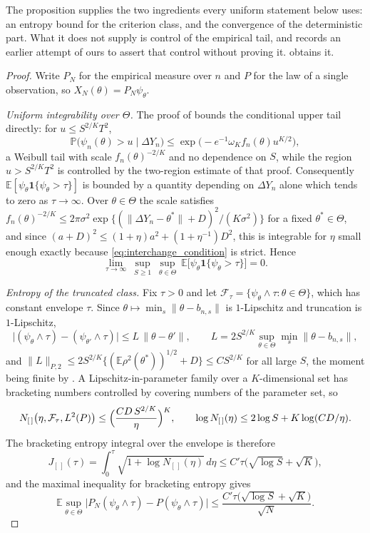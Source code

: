 \documentclass[11pt]{article}
\theoremstyle{definition}
\newcommand{\E}{\mathbb{E}}
\newcommand{\Pp}{\mathbb{P}}
\begin{document}
The proposition supplies the two ingredients every uniform statement below uses: an entropy bound for the criterion class, and the convergence of the deterministic part. What it does not supply is control of the empirical tail, and  records an earlier attempt of ours to assert that control without proving it.  obtains it.

\begin{proof}
Write $P_N$ for the empirical measure over $n$ and $P$ for the law of a single observation, so $X_N(\theta)=P_N\psi_\theta$.

\emph{Uniform integrability over $\Theta$.} The proof of  bounds the conditional upper tail directly: for $u\le S^{2/K}T^2$,
\[
\Pp\bigl(\psi_n(\theta)>u\mid\Delta Y_n\bigr)\le\exp\bigl(-e^{-1}\omega_Kf_n(\theta)u^{K/2}\bigr),
\]
a Weibull tail with scale $f_n(\theta)^{-2/K}$ and no dependence on $S$, while the region $u>S^{2/K}T^2$ is controlled by the two-region estimate of that proof. Consequently $\E[\psi_\theta\mathbf{1}\{\psi_\theta>\tau\}]$ is bounded by a quantity depending on $\Delta Y_n$ alone which tends to zero as $\tau\to\infty$. Over $\theta\in\Theta$ the scale satisfies $f_n(\theta)^{-2/K}\le2\pi\sigma^2\exp\{(\lVert\Delta Y_n-\theta^*\rVert+D)^2/(K\sigma^2)\}$ for a fixed $\theta^*\in\Theta$, and since $(a+D)^2\le(1+\eta)a^2+(1+\eta^{-1})D^2$, this is integrable for $\eta$ small enough exactly because \eqref{eq:interchange_condition} is strict. Hence
\begin{equation}\label{eq:uniform_ui}
\lim_{\tau\to\infty}\ \sup_{S\ge1}\ \sup_{\theta\in\Theta}\ \E\bigl[\psi_\theta\mathbf{1}\{\psi_\theta>\tau\}\bigr]=0 .
\end{equation}

\emph{Entropy of the truncated class.} Fix $\tau>0$ and let $\mathcal F_\tau=\{\psi_\theta\wedge\tau:\theta\in\Theta\}$, which has constant envelope $\tau$. Since $\theta\mapsto\min_s\lVert\theta-b_{n,s}\rVert$ is $1$-Lipschitz and truncation is $1$-Lipschitz,
\[
\bigl\lvert(\psi_\theta\wedge\tau)-(\psi_{\theta'}\wedge\tau)\bigr\rvert
\le L\,\lVert\theta-\theta'\rVert,
\qquad
L=2S^{2/K}\sup_{\theta\in\Theta}\min_s\lVert\theta-b_{n,s}\rVert ,
\]
and $\lVert L\rVert_{P,2}\le2S^{2/K}\{(\E\rho^2(\theta^*))^{1/2}+D\}\le CS^{2/K}$ for all large $S$, the moment being finite by . A Lipschitz-in-parameter family over a $K$-dimensional set has bracketing numbers controlled by covering numbers of the parameter set, so
\[
N_{[\,]}\bigl(\eta,\mathcal F_\tau,L^2(P)\bigr)\le\Bigl(\frac{CD\,S^{2/K}}{\eta}\Bigr)^{K},
\qquad
\log N_{[\,]}(\eta)\le2\log S+K\log(CD/\eta) .
\]
The bracketing entropy integral over the envelope is therefore
\[
J_{[\,]}(\tau)=\int_0^\tau\sqrt{1+\log N_{[\,]}(\eta)}\,d\eta\le C'\tau\bigl(\sqrt{\log S}+\sqrt K\bigr),
\]
and the maximal inequality for bracketing entropy gives
\begin{equation}\label{eq:uniform_maximal}
\E\sup_{\theta\in\Theta}\bigl\lvert P_N(\psi_\theta\wedge\tau)-P(\psi_\theta\wedge\tau)\bigr\rvert
\le\frac{C'\tau\bigl(\sqrt{\log S}+\sqrt K\bigr)}{\sqrt N} .
\end{equation}


\end{proof}
\end{document}
